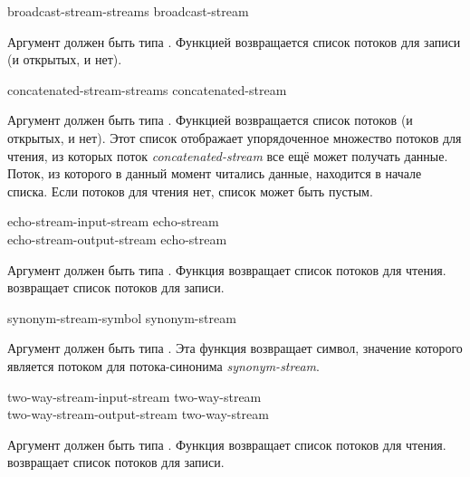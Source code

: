 \begin{new}

\begin{defun}[Функция]
broadcast-stream-streams broadcast-stream

Аргумент должен быть типа .
Функцией возвращается список потоков для записи (и открытых, и нет).
\end{defun}

\begin{defun}[Функция]
concatenated-stream-streams concatenated-stream

Аргумент должен быть типа .
Функцией возвращается список потоков (и открытых, и нет).
Этот список отображает упорядоченное множество потоков для чтения, из которых
поток \emph{concatenated-stream} все ещё может получать данные. Поток, из
которого в данный момент читались данные, находится в начале списка.
Если потоков для чтения нет, список может быть пустым.
\end{defun}


\begin{defun}[Функция]
echo-stream-input-stream echo-stream \\
echo-stream-output-stream echo-stream

Аргумент должен быть типа .
Функция  возвращает список потоков для чтения.
 возвращает список потоков для записи.
\end{defun}


\begin{defun}[Функция]
synonym-stream-symbol synonym-stream

Аргумент должен быть типа . Эта функция возвращает символ,
значение которого является потоком для потока-синонима \emph{synonym-stream}.
\end{defun}


\begin{defun}[Функция]
two-way-stream-input-stream two-way-stream \\
two-way-stream-output-stream two-way-stream

Аргумент должен быть типа .
Функция  возвращает список потоков для чтения. 
 возвращает список потоков для записи.
\end{defun}

\end{new}

\fi